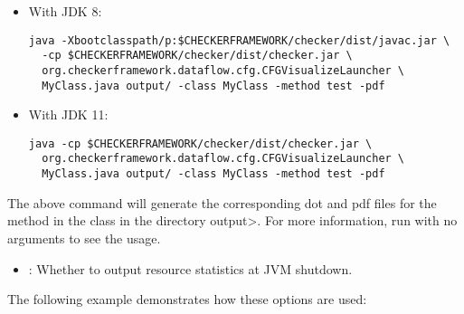 \begin{itemize}

\item With JDK 8:

\begin{smaller}
\begin{Verbatim}
java -Xbootclasspath/p:$CHECKERFRAMEWORK/checker/dist/javac.jar \
  -cp $CHECKERFRAMEWORK/checker/dist/checker.jar \
  org.checkerframework.dataflow.cfg.CFGVisualizeLauncher \
  MyClass.java output/ -class MyClass -method test -pdf
\end{Verbatim}
\end{smaller}


\item With JDK 11:

\begin{smaller}
\begin{Verbatim}
java -cp $CHECKERFRAMEWORK/checker/dist/checker.jar \
  org.checkerframework.dataflow.cfg.CFGVisualizeLauncher \
  MyClass.java output/ -class MyClass -method test -pdf
\end{Verbatim}
\end{smaller}

\end{itemize}

\noindent
The above command will generate the corresponding dot and pdf files for the
method  in the class  in the directory \<output>. For more
information, run  with no arguments to
see the usage.


\begin{itemize}

\item {}:
  Whether to output resource statistics at JVM shutdown.

\end{itemize}



The following example demonstrates how these options are used:

